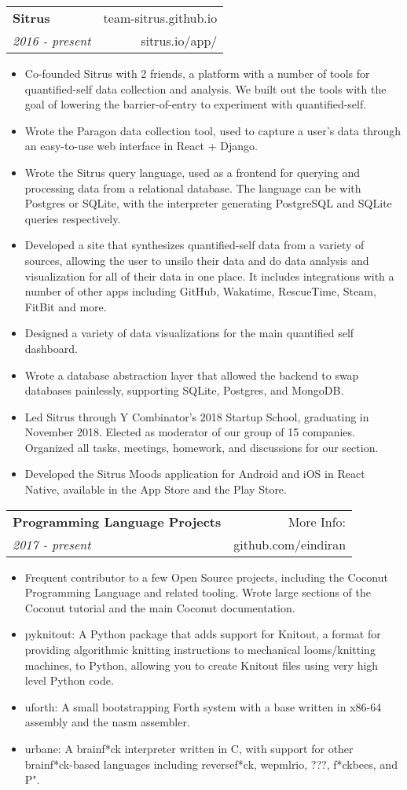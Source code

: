 \documentclass[letterpaper,10pt]{article}
\makeatletter
\newcommand{\resitem}[1]{
    \item #1 \vspace{-2pt}
}
\newcommand{\ressubheading}[4]{
    \begin{tabular*}{7in}{
        l@{\cftdotfill{\cftsecdotsep}\extracolsep{\fill}}r}
		    \textbf{#1} & #2 \\
		    \textit{#3} & #4 \\
    \end{tabular*}
    \vspace{-6pt}}
\makeatother
\begin{document}
\ressubheading{Sitrus}{team-sitrus.github.io}{2016 - present}{sitrus.io/app/}
\begin{itemize}
    \resitem{Co-founded Sitrus with 2 friends, a platform with a number of tools for quantified-self data collection and analysis. We built out the tools with the goal of lowering the barrier-of-entry to experiment with quantified-self.}
        \resitem{Wrote the Paragon data collection tool, used to capture a user's data through an easy-to-use web interface in React + Django.}
        \resitem{Wrote the Sitrus query language, used as a frontend for querying and processing data from a relational database. The language can be with Postgres or SQLite, with the interpreter generating PostgreSQL and SQLite queries respectively.}
        \resitem{Developed a site that synthesizes quantified-self data from a variety of sources, allowing the user to unsilo their data and do data analysis and visualization for all of their data in one place. It includes integrations with a number of other apps including GitHub, Wakatime, RescueTime, Steam, FitBit and more.}
        \resitem{Designed a variety of data visualizations for the main quantified self dashboard.}
        \resitem{Wrote a database abstraction layer that allowed the backend to swap databases painlessly, supporting SQLite, Postgres, and MongoDB.}
    	\resitem{Led Sitrus through Y Combinator's 2018 Startup School, graduating in November 2018. Elected as moderator of our group of 15 companies. Organized all tasks, meetings, homework, and discussions for our section.}
    	\resitem{Developed the Sitrus Moods application for Android and iOS in React Native, available in the App Store and the Play Store.}
\end{itemize}

\ressubheading{Programming Language Projects}{More Info:}{2017 - present}{github.com/eindiran}
\begin{itemize}
    \resitem{Frequent contributor to a few Open Source projects, including the Coconut Programming Language and related tooling. Wrote large sections of the Coconut tutorial and the main Coconut documentation.}
    \resitem{pyknitout: A Python package that adds support for Knitout, a format for providing algorithmic knitting instructions to mechanical looms/knitting machines, to Python, allowing you to create Knitout files using very high level Python code.}
    \resitem{uforth: A small bootstrapping Forth system with a base written in x86-64 assembly and the nasm assembler.}
    \resitem{urbane: A brainf*ck interpreter written in C, with support for other brainf*ck-based languages including reversef*ck, wepmlrio, ???, f*ckbees, and P".}
\end{itemize}
\end{document}
